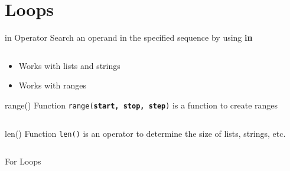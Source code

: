     \section{Loops}
        \begin{frame}{in Operator}
            Search an operand in the specified sequence by using \textbf{in}
            \bigskip
            \inputminted[frame=single,framesep=2pt]{python3}{code-examples/in_operator.py}
            \begin{itemize}
                \item Works with lists and strings
                \item Works with ranges
            \end{itemize}
        \end{frame}
        \begin{frame}{range() Function}
            \texttt{range(\textbf{start, stop, step})} is a function to create ranges
            \bigskip
            \inputminted[frame=single,framesep=2pt]{python3}{code-examples/range.py}
        \end{frame}
        \begin{frame}{len() Function}
            \texttt{len()} is an operator to determine the size of lists, strings, etc.
            \bigskip
            \inputminted[frame=single,framesep=2pt]{python3}{code-examples/length.py}
        \end{frame}
        \begin{frame}{For Loops}
            \begin{columns}
                \begin{column}{0.5\textwidth}
                    \inputminted[frame=single,framesep=2pt]{python3}{code-examples/for1.py}
                \end{column}
               \pause 
                \begin{column}{0.5\textwidth}
                    \inputminted[frame=single,framesep=2pt]{python3}{code-examples/for2.py}
                    \pause
                    \inputminted[frame=single,framesep=2pt]{python3}{code-examples/for3.py}
                    \pause
                    \inputminted[frame=single,framesep=2pt]{python3}{code-examples/for4.py}
                \end{column} 
            \end{columns}
        \end{frame}
